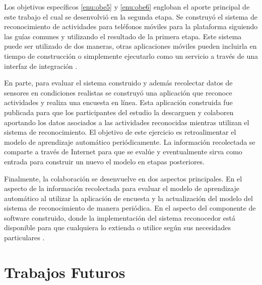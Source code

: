Los objetivos específicos \ref{enu:obe5} y \ref{enu:obe6} engloban
el aporte principal de este trabajo el cual se desenvolvió en la segunda
etapa. Se construyó el sistema de reconocimiento de actividades para
teléfonos móviles para la plataforma \emph{} siguiendo
las guías comunes y utilizando el resultado de la primera etapa. Este
sistema puede ser utilizado de dos maneras, otras aplicaciones móviles
pueden incluirla en tiempo de construcción o simplemente ejecutarlo
como un servicio a través de una interfaz de integración \cite{GimenezYegros2016a}.

En parte, para evaluar el sistema construido y además recolectar datos
de sensores en condiciones realistas se construyó una aplicación que
reconoce actividades y realiza una encuesta en línea. Esta aplicación
\emph{} construida fue publicada para que los participantes
del estudio la descarguen y colaboren aportando los datos asociados
a las actividades reconocidas mientras utilizan el sistema de reconocimiento.
El objetivo de este ejercicio es retroalimentar el modelo de aprendizaje
automático periódicamente. La información recolectada se comparte
a través de Internet para que se evalúe y eventualmente sirva como
entrada para construir un nuevo el modelo en etapas posteriores.

Finalmente, la colaboración se desenvuelve en dos aspectos principales.
En el aspecto de la información recolectada para evaluar el modelo
de aprendizaje automático al utilizar la aplicación de encuesta y
la actualización del modelo del sistema de reconocimiento de manera
periódica. En el aspecto del componente de software construido, donde
la implementación del sistema reconocedor está disponible para que
cualquiera lo extienda o utilice según sus necesidades particulares
\cite{GimenezYegros2016b}.

\section{Trabajos Futuros}

\label{sec82:trabajos-futuros}

